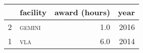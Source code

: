 \begin{tabular}{rlrr}

\toprule & \multicolumn{1}{c}{facility} & \multicolumn{1}{c}{award (hours)}  & \multicolumn{1}{c}{year} \\ 
\midrule

2  &  \textsc{\MakeTextLowercase{Gemini}}  &  1.0  &  2016\\

1  &  \textsc{\MakeTextLowercase{VLA}}  &  6.0  &  2014\\

\bottomrule\end{tabular}
